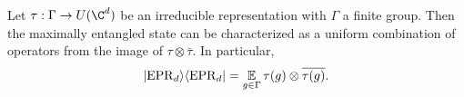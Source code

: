 \begin{lemma}
	Let $\tau:\Gamma \to U(\C^d)$ be an irreducible representation with $\Gamma$ a finite group. Then the maximally entangled state can be characterized as a uniform combination of operators from the image of $\tau\otimes \bar{\tau}$. In particular,
	\begin{equation}
        \ket{{\mathrm{EPR}_d}}\!\bra{{\mathrm{EPR}_d}} = \operatorname*{\mathbb E}\limits_{g\in \Gamma}\tau(g) \otimes \overline{\tau(g)}.
	\end{equation}
\end{lemma}
